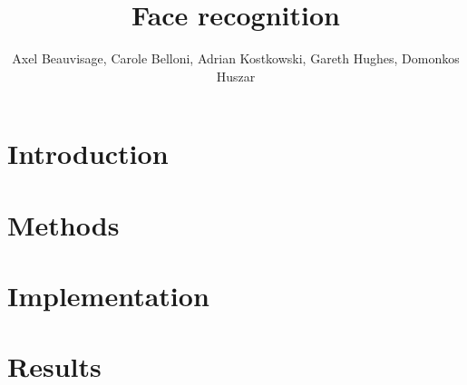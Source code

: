 \documentclass[journal]{IEEEtran}
\begin{document}
%
\title{Face recognition}

\author{Axel Beauvisage, Carole Belloni, Adrian Kostkowski, Gareth Hughes, Domonkos Huszar}


\maketitle


\begin{abstract}


\end{abstract}


\IEEEpeerreviewmaketitle
\section{Introduction}


\section {Methods}


\section {Implementation}


\section{Results}

\end{document}
